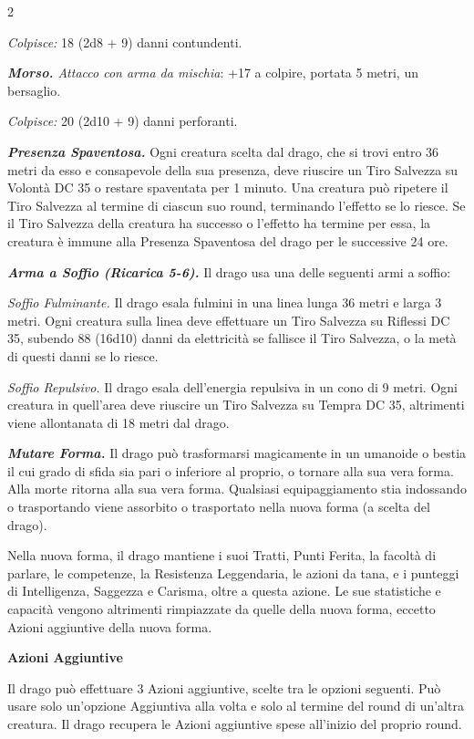 \begin{multicols}{2}
{\emph{Colpisce:} 18 (2d8 + 9) danni contundenti.

\emph{\textbf{Morso.} Attacco con arma da mischia}: +17 a colpire, portata 5 metri, un bersaglio.

\emph{Colpisce:} 20 (2d10 + 9) danni perforanti.

\emph{\textbf{Presenza Spaventosa.}} Ogni creatura scelta dal drago, che si trovi entro 36 metri da esso e consapevole della sua presenza, deve riuscire un Tiro Salvezza su Volontà DC 35 o restare spaventata per 1 minuto. Una creatura può ripetere il Tiro Salvezza al termine di ciascun suo round, terminando l'effetto se lo riesce. Se il Tiro Salvezza della creatura ha successo o l'effetto ha termine per essa, la creatura è immune alla Presenza Spaventosa del drago per le successive 24 ore.

\emph{\textbf{Arma a Soffio (Ricarica 5-6).}} Il drago usa una delle seguenti armi a soffio:

\emph{Soffio Fulminante.} Il drago esala fulmini in una linea lunga 36 metri e larga 3 metri. Ogni creatura sulla linea deve effettuare un Tiro Salvezza su Riflessi DC 35, subendo 88 (16d10) danni da elettricità se fallisce il Tiro Salvezza, o la metà di questi danni se lo riesce.

\emph{Soffio Repulsivo.} Il drago esala dell'energia repulsiva in un cono di 9 metri. Ogni creatura in quell'area deve riuscire un Tiro Salvezza su Tempra DC 35, altrimenti viene allontanata di 18 metri dal drago.

\emph{\textbf{Mutare Forma.}} Il drago può trasformarsi magicamente in un umanoide o bestia il cui grado di sfida sia pari o inferiore al proprio, o tornare alla sua vera forma. Alla morte ritorna alla sua vera forma. Qualsiasi equipaggiamento stia indossando o trasportando viene assorbito o trasportato nella nuova forma (a scelta del drago).

Nella nuova forma, il drago mantiene i suoi Tratti, Punti Ferita, la facoltà di parlare, le competenze, la Resistenza Leggendaria, le azioni da tana, e i punteggi di Intelligenza, Saggezza e Carisma, oltre a questa azione. Le sue statistiche e capacità vengono altrimenti rimpiazzate da quelle della nuova forma, eccetto Azioni aggiuntive della nuova forma.

\textbf{Azioni Aggiuntive}

Il drago può effettuare 3 Azioni aggiuntive, scelte tra le opzioni seguenti. Può usare solo un'opzione Aggiuntiva alla volta e solo al termine del round di un'altra creatura. Il drago recupera le Azioni aggiuntive spese all'inizio del proprio round.

}
\end{multicols}
